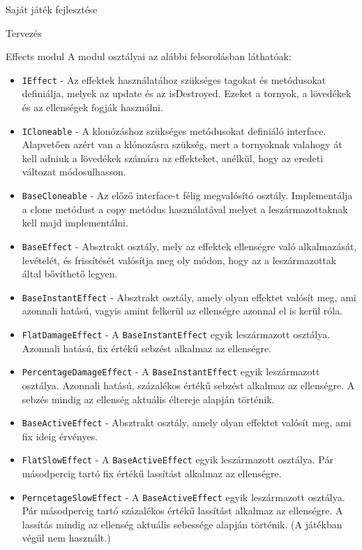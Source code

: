 \begin{MyChapter}{Saját játék fejlesztése}
\begin{MySection}{Tervezés}
\begin{MySubSection}{Effects modul}
			A modul osztályai az alábbi felsorolásban láthatóak:
			\begin{itemize}
				\item \texttt{IEffect} - Az effektek használatához szükséges tagokat és metódusokat definiálja, melyek az update és az isDestroyed. Ezeket a tornyok, a lövedékek és az ellenségek fogják használni.
				
				\item \texttt{ICloneable} - A klonózáshoz szükséges metódusokat definiáló interface. Alapvetően azért van a klónozásra szükség, mert a tornyoknak valahogy át kell adniuk a lövedékek számára az effekteket, anélkül, hogy az eredeti változat módosulhasson.

				\item \texttt{BaseCloneable} - Az előző interface-t félig megvalósító osztály. Implementálja a clone metódust a copy metódus használatával melyet a leszármazottaknak kell majd implementálni.

				\item \texttt{BaseEffect} - Absztrakt osztály, mely az effektek ellenségre való alkalmazását, levételét, és frissítését valósítja meg oly módon, hogy az a leszármazottak által bővíthető legyen.

				\item \texttt{BaseInstantEffect} - Absztrakt osztály, amely olyan effektet valósít meg, ami azonnali hatású, vagyis amint felkerül az ellenségre azonnal el is kerül róla.

				\item \texttt{FlatDamageEffect} - A \texttt{BaseInstantEffect} egyik leszármazott osztálya. Azonnali hatású, fix értékű sebzést alkalmaz az ellenségre.

				\item \texttt{PercentageDamageEffect} - A \texttt{BaseInstantEffect} egyik leszármazott osztálya. Azonnali hatású, százalékos értékű sebzést alkalmaz az ellenségre. A sebzés mindig az ellenség aktuális éltereje alapján történik.

				\item \texttt{BaseActiveEffect} - Absztrakt osztály, amely olyan effektet valósít meg, ami fix ideig érvényes.

				\item \texttt{FlatSlowEffect} - A \texttt{BaseActiveEffect} egyik leszármazott osztálya. Pár másodpercig tartó fix értékű lassítást alkalmaz az ellenségre.

				\item \texttt{PerncetageSlowEffect} - A \texttt{BaseActiveEffect} egyik leszármazott osztálya. Pár másodpercig tartó százalékos értékű lassítást alkalmaz az ellenségre. A lassítás mindig az ellenség aktuális sebessége alapján történik. (A játékban végül nem használt.)


\end{itemize}
\end{MySubSection}
\end{MySection}
\end{MyChapter}
